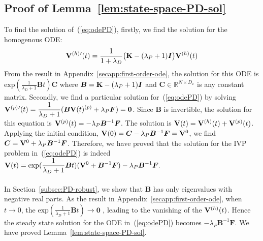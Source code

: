 \subsection{Proof of Lemma~\ref{lem:state-space-PD-sol}}
\label{secapp:state-space-PD-sol}
To find the solution of~(\ref{eq:odePD}), firstly, we find the solution for the homogenous ODE:
\begin{align}
\nonumber
    {\mathbf V}^{(h)}{'}(t) = \frac{1}{1 + \lambda_D}\bigl({\mathbf K} - (\lambda_P + 1)\bm{I} \bigl){\mathbf V}^{(h)}(t)
\end{align}
From the result in Appendix~\ref{secapp:first-order-ode}, the solution for this ODE is $\mathrm{exp}(\displaystyle \frac{1}{\lambda_D + 1}\bm{B}t)\bm{C}$ where $\bm{B} = {\mathbf K} - (\lambda_P + 1)\bm{I}$ and $\bm{C} \in \mathbb{R}^{N \times D_x} $ is any constant matrix.
Secondly, we find a particular solution for~(\ref{eq:odePD}) by solving ${\mathbf V}^{(p)}{'}(t) = \displaystyle \frac{1}{\lambda_D + 1}(\bm{B}{\mathbf V}(t)^{(p)} + \lambda_P\bm{F}) = \bm{0}$. Since $\bm{B}$ is invertible, the solution for this equation is ${\mathbf V}^{(p)}(t) = -\lambda_P\bm{B}^{-1}\bm{F}$. The solution is ${\mathbf V}(t) = {\mathbf V}^{(h)}(t) + {\mathbf V}^{(p)}(t)$. Applying the initial condition, ${\mathbf V}(0) = \bm{C} -\lambda_P\bm{B}^{-1}\bm{F} = {\mathbf V}^0$, we find $\bm{C} = {\mathbf V}^0 + \lambda_P\bm{B}^{-1}\bm{F}$. Therefore, we have proved that the solution for the IVP problem in~(\ref{eq:odePD}) is indeed ${\mathbf V}(t) = \displaystyle \mathrm{exp}(\frac{1}{\lambda_D + 1}\bm{B}t)({\mathbf V}^0 + \bm{B}^{-1}\bm{F}) - \lambda_P\bm{B}^{-1}\bm{F}.$\\ \\
In Section~\ref{subsec:PD-robust}, we show that $\bm{B}$ has only eigenvalues with negative real parts. As the result in Appendix~\ref{secapp:first-order-ode}, when $t \rightarrow 0$, the $\mathrm{exp}(\displaystyle\frac{1}{\lambda_D + 1}\bm{B}t) \rightarrow \bm{0}$ , leading to the vanishing of the ${\mathbf V}^{(h)}(t)$. Hence the steady state solution for the ODE in~(\ref{eq:odePD}) becomes $ - \lambda_P\bm{B}^{-1}\bm{F}$. We have proved Lemma~\ref{lem:state-space-PD-sol}.
